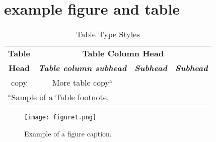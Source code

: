 \documentclass[conference,a4paper]{IEEEtran}
\begin{document}
\section{example figure and table}
\begin{table}[htbp]
\caption{Table Type Styles}
\begin{center}
\begin{tabular}{|c|c|c|c|}
\hline
\textbf{Table}&\multicolumn{3}{|c|}{\textbf{Table Column Head}} \\
\cline{2-4} 
\textbf{Head} & \textbf{\textit{Table column subhead}}& \textbf{\textit{Subhead}}& \textbf{\textit{Subhead}} \\
\hline
copy& More table copy$^{\mathrm{a}}$& &  \\
\hline
\multicolumn{4}{l}{$^{\mathrm{a}}$Sample of a Table footnote.}
\end{tabular}
\label{tab1}
\end{center}
\end{table}

\begin{figure}[htbp]
\centerline{\texttt{[image: figure1.png]}}
\caption{Example of a figure caption.}
\label{fig}
\end{figure}




\end{document}
